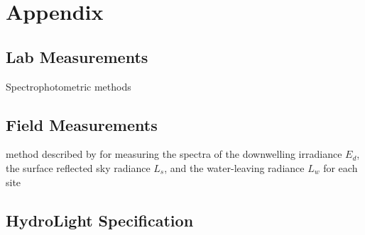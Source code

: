 \appendix
\chapter*{Appendix}
\renewcommand{\thesection}{\Alph{section}}

\section{Lab Measurements}
\label{sec:labmea} 

Spectrophotometric methods

\section{Field Measurements}
\label{sec:fieldmea}

method described by \cite{Mobley:1999} for measuring the spectra of the downwelling irradiance $E_d$, the surface reflected sky radiance $L_s$, and the water-leaving radiance $L_w$ for each site 

\section{HydroLight Specification}